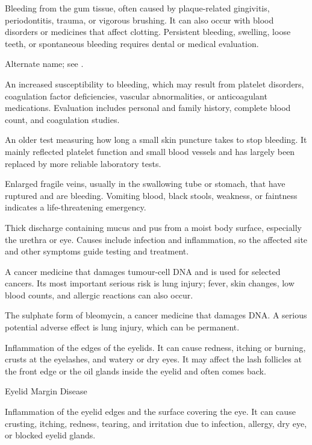  Bleeding from the gum tissue, often caused by plaque-related gingivitis, periodontitis, trauma, or vigorous brushing.
It can also occur with blood disorders or medicines that affect clotting. Persistent bleeding, swelling,
loose teeth, or spontaneous bleeding requires dental or medical evaluation.

 Alternate name; see .

 An increased susceptibility to bleeding, which may result from platelet disorders, coagulation factor deficiencies, vascular abnormalities, or anticoagulant medications. Evaluation includes personal and family history, complete blood count, and coagulation studies.

 An older test measuring how long a small skin puncture takes to stop bleeding. It mainly reflected platelet function and small blood vessels and has largely been replaced by more reliable laboratory tests.

 Enlarged fragile veins, usually in the swallowing tube or stomach, that have ruptured and are bleeding. Vomiting blood, black stools, weakness, or faintness indicates a life-threatening emergency.

 Thick discharge containing mucus and pus from a moist body surface, especially the urethra or eye. Causes include infection and inflammation, so the affected site and other symptoms guide testing and treatment.

 A cancer medicine that damages tumour-cell DNA and is used for selected cancers. Its most important serious risk is lung injury; fever, skin changes, low blood counts, and allergic reactions can also occur.

 The sulphate form of bleomycin, a cancer medicine
that damages DNA. A serious potential adverse effect is lung injury, which can
be permanent.

 Inflammation of the edges of the eyelids. It can cause
redness, itching or burning, crusts at the eyelashes, and watery or dry eyes.
It may affect the lash follicles at the front edge or the oil glands inside
the eyelid and often comes back.

\synonyms
Eyelid Margin Disease

 Inflammation of the eyelid edges and the surface covering the eye. It can cause crusting, itching, redness, tearing, and irritation due to infection, allergy, dry eye, or blocked eyelid glands.

